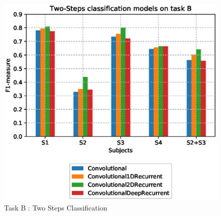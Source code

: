 \begin{figure}[ht]
	\centering
	\includegraphics[scale=.4]{figure/B_models_nonullclass}
	\caption{Task B : Two Steps Classification}
	\label{fig:Bnonull}
\end{figure}